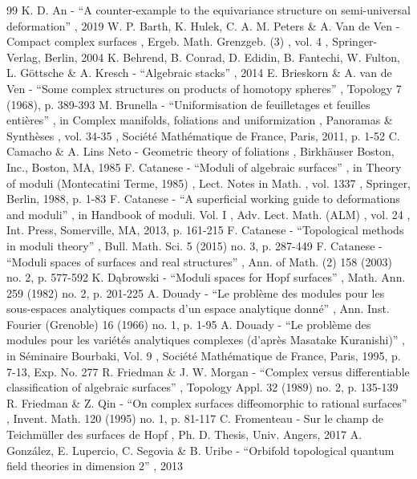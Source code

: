 \begin{thebibliography}{99}
 K. D. An - “A counter-example to the equivariance structure on semi-universal deformation” , 2019
 W. P. Barth, K. Hulek, C. A. M. Peters \& A. Van de Ven - Compact complex surfaces , Ergeb. Math. Grenzgeb. (3) , vol. 4 , Springer-Verlag, Berlin, 2004
 K. Behrend, B. Conrad, D. Edidin, B. Fantechi, W. Fulton, L. Göttsche \& A. Kresch - “Algebraic stacks” , 2014
 E. Brieskorn \& A. van de Ven - “Some complex structures on products of homotopy spheres” , Topology 7 (1968), p. 389-393
 M. Brunella - “Uniformisation de feuilletages et feuilles entières” , in Complex manifolds, foliations and uniformization , Panoramas \& Synthèses , vol. 34-35 , Société Mathématique de France, Paris, 2011, p. 1-52
 C. Camacho \& A. Lins Neto - Geometric theory of foliations , Birkhäuser Boston, Inc., Boston, MA, 1985
 F. Catanese - “Moduli of algebraic surfaces” , in Theory of moduli (Montecatini Terme, 1985) , Lect. Notes in Math. , vol. 1337 , Springer, Berlin, 1988, p. 1-83
 F. Catanese - “A superficial working guide to deformations and moduli” , in Handbook of moduli. Vol. I , Adv. Lect. Math. (ALM) , vol. 24 , Int. Press, Somerville, MA, 2013, p. 161-215
 F. Catanese - “Topological methods in moduli theory” , Bull. Math. Sci. 5 (2015) no. 3, p. 287-449
 F. Catanese - “Moduli spaces of surfaces and real structures” , Ann. of Math. (2) 158 (2003) no. 2, p. 577-592
 K. Dąbrowski - “Moduli spaces for Hopf surfaces” , Math. Ann. 259 (1982) no. 2, p. 201-225
 A. Douady - “Le problème des modules pour les sous-espaces analytiques compacts d’un espace analytique donné” , Ann. Inst. Fourier (Grenoble) 16 (1966) no. 1, p. 1-95
 A. Douady - “Le problème des modules pour les variétés analytiques complexes (d’après Masatake Kuranishi)” , in Séminaire Bourbaki, Vol. 9 , Société Mathématique de France, Paris, 1995, p. 7-13, Exp. No. 277
 R. Friedman \& J. W. Morgan - “Complex versus differentiable classification of algebraic surfaces” , Topology Appl. 32 (1989) no. 2, p. 135-139
 R. Friedman \& Z. Qin - “On complex surfaces diffeomorphic to rational surfaces” , Invent. Math. 120 (1995) no. 1, p. 81-117
 C. Fromenteau - Sur le champ de Teichmüller des surfaces de Hopf , Ph. D. Thesis, Univ. Angers, 2017
 A. González, E. Lupercio, C. Segovia \& B. Uribe - “Orbifold topological quantum field theories in dimension $2$” , 2013

\end{thebibliography}
